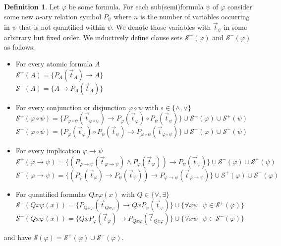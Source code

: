 \documentclass[a4paper,12pt]{report}
\theoremstyle{definition}
\theoremstyle{definition}
\theoremstyle{definition}
\theoremstyle{definition}
\theoremstyle{definition}
\newtheorem{definition}[theorem]{Definition}
\theoremstyle{definition}
\theoremstyle{definition}
\begin{document}
	\begin{definition}
		Let $\varphi$ be some formula. For each sub(semi)formula $\psi$ of $\varphi$ consider some new $n$-ary relation symbol $P_\psi$ where $n$ is the number of variables occurring in $\psi$ that is not quantified within $\psi$. We denote those variables with $\vec t_\psi$ in some arbitrary but fixed order. We inductively define clause sets $\mathcal S^+(\varphi)$ and $\mathcal S^-(\varphi)$ as follows:
		\begin{itemize}
			\item For every atomic formula $A$\\$\mathcal S^+(A) = \{P_A(\vec t_A)\to A\}$\\$\mathcal S^-(A) = \{A\to P_A(\vec t_A)\}$
			\item For every conjunction or disjunction $\varphi\circ\psi$ with $\circ\in\{\wedge,\vee\}$\\$\mathcal S^+(\varphi\circ\psi) = \{P_{\varphi\circ\psi}(\vec t_{\varphi\circ\psi})\to P_{\varphi}(\vec t_\varphi)\circ P_{\psi}(\vec t_\psi)\}\cup \mathcal S^+(\varphi)\cup \mathcal S^+(\psi)$\\$\mathcal S^-(\varphi\circ\psi) =\{P_{\varphi}(\vec t_\varphi)\circ P_{\psi}(\vec t_\psi)\to P_{\varphi\circ\psi}(\vec t_{\varphi\circ\psi})\}\cup \mathcal S^-(\varphi)\cup \mathcal S^-(\psi)$
			\item For every implication $\varphi \to\psi$\\$\mathcal S^+(\varphi\to\psi) = \{(P_{\varphi\to\psi}(\vec t_{\varphi\to\psi})\wedge P_{\varphi}(\vec t_\varphi))\to P_{\psi}(\vec t_\psi)\}\cup \mathcal S^-(\varphi)\cup \mathcal S^+(\psi)$\\$\mathcal S^-(\varphi\to\psi)  = \{(P_{\varphi}(\vec t_\varphi)\to P_{\psi}(\vec t_\psi))\to P_{\varphi\to\psi}(\vec t_{\varphi\to\psi})\}\cup \mathcal S^+(\varphi)\cup \mathcal S^-(\varphi)$
			\item For quantified formulas $Qx\varphi(x)$ with $Q\in \{\forall,\exists\}$\\$\mathcal S^+(Qx\varphi(x)) = \{P_{Qx\varphi}(\vec t_{Qx\varphi})\to QxP_{\varphi}(\vec t_{\varphi})\}\cup \{\forall x\psi\:|\:\psi\in\mathcal S^+(\varphi)\}$\\$\mathcal S^-(Qx\varphi(x))  = \{QxP_{\varphi}(\vec t_{\varphi})\to P_{Qx\varphi}(\vec t_{Qx\varphi})\}\cup \{\forall x\psi\:|\:\psi\in\mathcal S^-(\varphi)\}$
		\end{itemize}
		and have $\mathcal S(\varphi) = \mathcal S^+(\varphi)\cup\mathcal S^-(\varphi)$.
	\end{definition}
	
\end{document}
